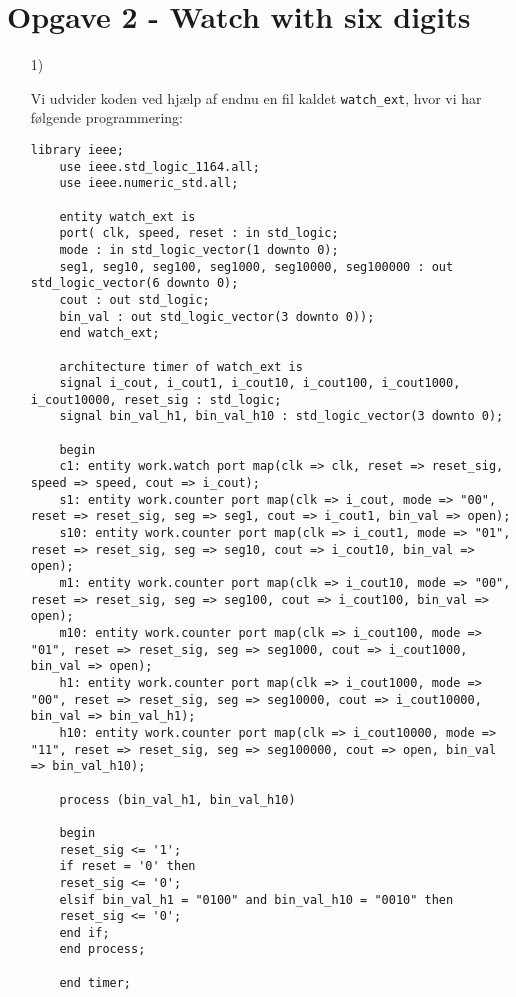\section{Opgave 2 - Watch with six digits}
\begin{enumerate}
	\item[1)]
	
	Vi udvider koden ved hjælp af endnu en fil kaldet \verb|watch_ext|, hvor vi har følgende programmering:
	
	\begin{lstlisting}[caption={VHDL code for binary circular watch with 6 digits},label={lst:Watch6digits}]
	library ieee;
	use ieee.std_logic_1164.all;
	use ieee.numeric_std.all;
	
	entity watch_ext is
	port( clk, speed, reset : in std_logic;
	mode : in std_logic_vector(1 downto 0);
	seg1, seg10, seg100, seg1000, seg10000, seg100000 : out std_logic_vector(6 downto 0);
	cout : out std_logic;
	bin_val : out std_logic_vector(3 downto 0));
	end watch_ext;
	
	architecture timer of watch_ext is
	signal i_cout, i_cout1, i_cout10, i_cout100, i_cout1000, i_cout10000, reset_sig : std_logic; 
	signal bin_val_h1, bin_val_h10 : std_logic_vector(3 downto 0);
	
	begin
	c1: entity work.watch port map(clk => clk, reset => reset_sig, speed => speed, cout => i_cout);
	s1: entity work.counter port map(clk => i_cout, mode => "00", reset => reset_sig, seg => seg1, cout => i_cout1, bin_val => open);
	s10: entity work.counter port map(clk => i_cout1, mode => "01", reset => reset_sig, seg => seg10, cout => i_cout10, bin_val => open);
	m1: entity work.counter port map(clk => i_cout10, mode => "00", reset => reset_sig, seg => seg100, cout => i_cout100, bin_val => open);
	m10: entity work.counter port map(clk => i_cout100, mode => "01", reset => reset_sig, seg => seg1000, cout => i_cout1000, bin_val => open);
	h1: entity work.counter port map(clk => i_cout1000, mode => "00", reset => reset_sig, seg => seg10000, cout => i_cout10000, bin_val => bin_val_h1);
	h10: entity work.counter port map(clk => i_cout10000, mode => "11", reset => reset_sig, seg => seg100000, cout => open, bin_val => bin_val_h10);
	
	process (bin_val_h1, bin_val_h10)
	
	begin
	reset_sig <= '1';
	if reset = '0' then
	reset_sig <= '0';
	elsif bin_val_h1 = "0100" and bin_val_h10 = "0010" then
	reset_sig <= '0';
	end if;
	end process;
	
	end timer;
	
	\end{lstlisting}
\end{enumerate}